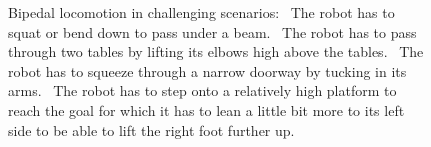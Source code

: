 \documentclass{article}
\begin{document}
\begin{figure}[t]%
  \centering%
\vspace{-2.5mm}
  \caption{%
    Bipedal locomotion in challenging scenarios: 
  ~The robot has to squat or bend down to pass under a beam.
  ~The robot has to pass through two tables by lifting its elbows high above the tables.
  ~The robot has to squeeze through a narrow doorway by tucking in its arms.
  ~The robot has to step onto a relatively high platform to reach the goal for which it has to lean a little bit more to its left side to be able to lift the right foot further up.
  }%
  \label{fig:biped_locomotion}%
  \vspace{-4.5mm}
\end{figure}
\end{document}
